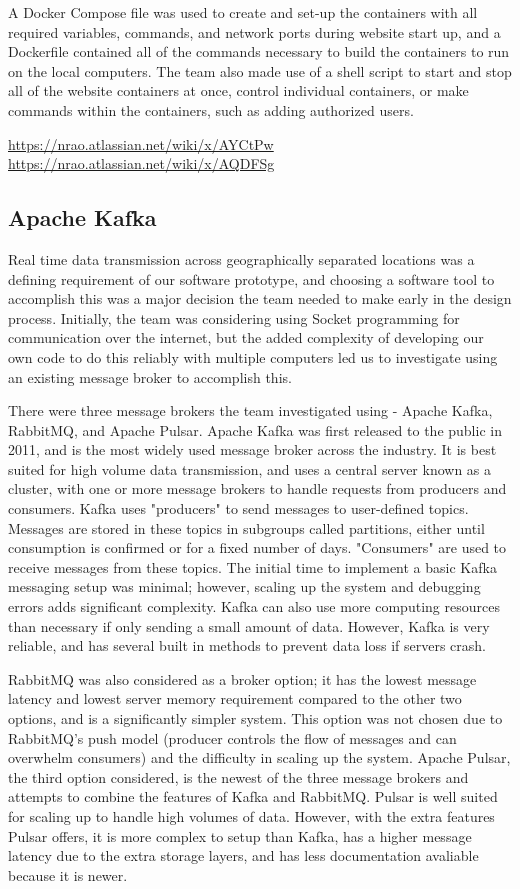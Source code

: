 \documentclass[12pt]{article}
\begin{document}
  A Docker Compose file was used to create and set-up the containers with all required variables, commands, and network ports during website start up, and a Dockerfile contained all of the commands necessary to build the containers to run on the local computers. The team also made use of a shell script to start and stop all of the website containers at once, control individual containers, or make commands within the containers, such as adding authorized users.  

\url{https://nrao.atlassian.net/wiki/x/AYCtPw}
\url{https://nrao.atlassian.net/wiki/x/AQDFSg}

\subsection*{Apache Kafka}

  Real time data transmission across geographically separated locations was a defining requirement of our software prototype, and choosing a software tool to accomplish this was a major decision the team needed to make early in the design process. Initially, the team was considering using Socket programming for communication over the internet, but the added complexity of developing our own code to do this reliably with multiple computers led us to investigate using an existing message broker to accomplish this.

There were three message brokers the team investigated using - Apache Kafka, RabbitMQ, and Apache Pulsar. Apache Kafka was first released to the public in 2011, and is the most widely used message broker across the industry. It is best suited for high volume data transmission, and uses a central server known as a cluster, with one or more message brokers to handle requests from producers and consumers. Kafka uses "producers" to send messages to user-defined topics. Messages are stored in these topics in subgroups called partitions, either until consumption is confirmed or for a fixed number of days. "Consumers" are used to receive messages from these topics. The initial time to implement a basic Kafka messaging setup was minimal; however, scaling up the system and debugging errors adds significant complexity. Kafka can also use more computing resources than necessary if only sending a small amount of data. However, Kafka is very reliable, and has several built in methods to prevent data loss if servers crash. 

RabbitMQ was also considered as a broker option; it has the lowest message latency and lowest server memory requirement compared to the other two options, and is a significantly simpler system. This option was not chosen due to RabbitMQ's push model (producer controls the flow of messages and can overwhelm consumers) and the difficulty in scaling up the system. Apache Pulsar, the third option considered, is the newest of the three message brokers and attempts to combine the features of Kafka and RabbitMQ. Pulsar is well suited for scaling up to handle high volumes of data. However, with the extra features Pulsar offers, it is more complex to setup than Kafka, has a higher message latency due to the extra storage layers, and has less documentation avaliable because it is newer.
\end{document}
